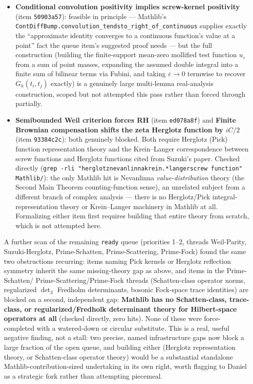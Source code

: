 \documentclass{report}
\theoremstyle{definition}
\begin{document}
\begin{itemize}
\item \textbf{Conditional convolution positivity implies screw-kernel positivity}
  (item \texttt{50903a57}): feasible in principle --- Mathlib's
  \texttt{ContDiffBump.convolution\_tendsto\_right\_of\_continuous} supplies exactly the
  ``approximate identity converges to a continuous function's value at a point'' fact the
  queue item's suggested proof needs --- but the full construction (building the
  finite-support mean-zero mollified test function $u_\varepsilon$ from a sum of point
  masses, expanding the assumed double integral into a finite sum of bilinear terms via
  Fubini, and taking $\varepsilon\to0$ termwise to recover $G_h(t_i,t_j)$ exactly) is a
  genuinely large multi-lemma real-analysis construction, scoped but not attempted this
  pass rather than forced through partially.
\item \textbf{Semibounded Weil criterion forces RH} (item \texttt{ed078a8f}) and
  \textbf{Finite Brownian compensation shifts the zeta Herglotz function by $iC/2$} (item
  \texttt{93384c2c}): both genuinely blocked. Both require Herglotz (Pick) function
  representation theory and the Krein--Langer correspondence between screw functions and
  Herglotz functions cited from Suzuki's paper. Checked directly (\texttt{grep -rli
  "herglotz\textbar nevanlinna\textbar krein.*langer\textbar screw function"
  Mathlib/}): the only Mathlib hit is Nevanlinna \emph{value-distribution} theory (the
  Second Main Theorem counting-function sense), an unrelated subject from a different branch
  of complex analysis --- there is no Herglotz/Pick integral-representation theory or
  Krein--Langer machinery in Mathlib at all. Formalizing either item first requires building
  that entire theory from scratch, which is not attempted here.
\end{itemize}

A further scan of the remaining \texttt{ready} queue (priorities 1--2, threads
Weil-Parity, Suzuki-Herglotz, Prime-Schatten, Prime-Scattering, Prime-Fock) found the same
two obstructions recurring: items naming Pick kernels or Herglotz reflection symmetry
inherit the same missing-theory gap as above, and items in the Prime-Schatten/
Prime-Scattering/Prime-Fock threads (Schatten-class operator norms, regularized $\det_3$
Fredholm determinants, bosonic Fock-space trace identities) are blocked on a second,
independent gap: \textbf{Mathlib has no Schatten-class, trace-class, or regularized/Fredholk
determinant theory for Hilbert-space operators at all} (checked directly, zero hits). None
of these were force-completed with a watered-down or circular substitute. This is a real,
useful negative finding, not a stall: two precise, named infrastructure gaps now block a
large fraction of the open queue, and building either (Herglotz representation theory, or
Schatten-class operator theory) would be a substantial standalone Mathlib-contribution-sized
undertaking in its own right, worth flagging to Daniel as a strategic fork rather than
attempting piecemeal.
\end{document}
